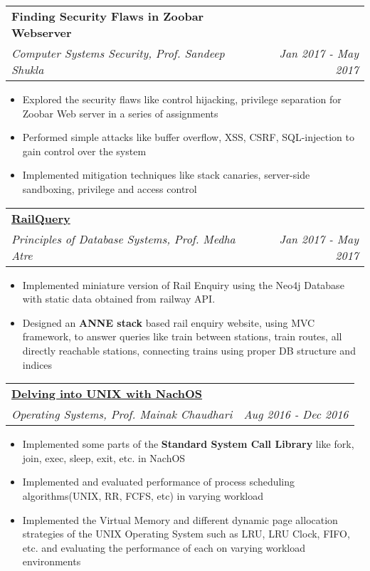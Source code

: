 \documentclass[letterpaper,11pt]{article}
\makeatletter
\newcommand{\resumeItem}[1]{
  \item\small{
    #1 \vspace{-2pt}
  }
}
\newcommand{\resumeSubheadingSpecial}[4]{
  \vspace{-1pt}\item
    \begin{tabular*}{0.97\textwidth}{l@{\extracolsep{\fill}}r}
      \textbf{#1} & #2 \\
      \textit{\small#3} & \textit{\small #4} \\
    \end{tabular*}\vspace{-5pt}
}
\newcommand{\resumeItemListStart}{\begin{itemize}[leftmargin=5mm]}
\newcommand{\resumeItemListEnd}{\end{itemize}\vspace{-5pt}}
\makeatother
\begin{document}
    \resumeSubheadingSpecial
      {Finding Security Flaws in Zoobar Webserver}
      {}{Computer Systems Security, Prof. Sandeep Shukla}{Jan 2017 - May 2017}
      \resumeItemListStart
        \resumeItem
          {Explored the security flaws like control hijacking, privilege separation for Zoobar Web server in a series of assignments}
        \resumeItem
          {Performed simple attacks like buffer overflow, XSS, CSRF, SQL-injection to gain control over the system}
        \resumeItem
          {Implemented mitigation techniques like stack canaries, server-side sandboxing, privilege and access control}
      \resumeItemListEnd

    \resumeSubheadingSpecial
      {\href{https://github.com/tulsyan/railquery}{RailQuery}}
      {}{Principles of Database Systems, Prof. Medha Atre}{Jan 2017 - May 2017}
      \resumeItemListStart
        \resumeItem
          {Implemented miniature version of Rail Enquiry using the Neo4j Database with static data obtained from railway API.}
        \resumeItem
        {Designed an \textbf{ANNE stack} based rail enquiry website, using MVC framework, to answer queries like train between stations, train routes, all directly reachable stations, connecting trains using proper DB structure and indices}
      \resumeItemListEnd
      
    \resumeSubheadingSpecial
      {\href{https://bitbucket.org/arhamchopra11/nachos-assignments}{Delving into UNIX with NachOS}}
      {}{Operating Systems, Prof. Mainak Chaudhari}{Aug 2016 - Dec 2016}
      \resumeItemListStart
        \resumeItem
          {Implemented some parts of the \textbf{Standard System Call Library} like fork, join, exec, sleep, exit, etc. in NachOS}
        \resumeItem
          {Implemented and evaluated performance of process scheduling algorithms(UNIX, RR, FCFS, etc) in varying workload}
        \resumeItem
          {Implemented the Virtual Memory and different dynamic page allocation strategies of the UNIX Operating System such as LRU, LRU Clock, FIFO, etc. and evaluating the performance of each on varying workload environments}
      \resumeItemListEnd
      
\end{document}
